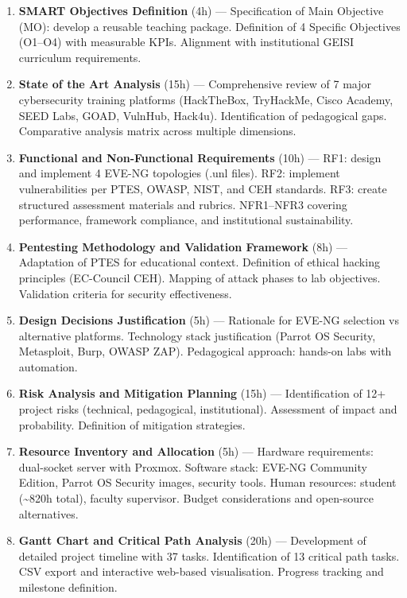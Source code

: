 \begin{enumerate}

\item \textbf{SMART Objectives Definition} (4h) --- Specification of Main Objective (MO):
develop a reusable teaching package. Definition of 4 Specific Objectives (O1--O4) with
measurable KPIs. Alignment with institutional GEISI curriculum requirements.

\item \textbf{State of the Art Analysis} (15h) --- Comprehensive review of 7 major
cybersecurity training platforms (HackTheBox, TryHackMe, Cisco Academy, SEED Labs, GOAD,
VulnHub, Hack4u). Identification of pedagogical gaps. Comparative analysis matrix across
multiple dimensions.

\item \textbf{Functional and Non-Functional Requirements} (10h) --- RF1: design and
implement 4 EVE-NG topologies (.unl files). RF2: implement vulnerabilities per
PTES\cite{ptes}, OWASP\cite{owasp_testing_guide}, NIST\cite{nist_framework}, and
CEH\cite{ceh_framework} standards. RF3: create structured assessment materials and rubrics.
NFR1--NFR3 covering performance, framework compliance, and institutional sustainability.

\item \textbf{Pentesting Methodology and Validation Framework} (8h) --- Adaptation of PTES
for educational context. Definition of ethical hacking principles (EC-Council CEH).
Mapping of attack phases to lab objectives. Validation criteria for security effectiveness.

\item \textbf{Design Decisions Justification} (5h) --- Rationale for EVE-NG selection vs
alternative platforms. Technology stack justification (Parrot OS Security, Metasploit, Burp,
OWASP ZAP). Pedagogical approach: hands-on labs with automation.

\item \textbf{Risk Analysis and Mitigation Planning} (15h) --- Identification of 12+ project
risks (technical, pedagogical, institutional). Assessment of impact and probability.
Definition of mitigation strategies.

\item \textbf{Resource Inventory and Allocation} (5h) --- Hardware requirements: dual-socket
server with Proxmox. Software stack: EVE-NG Community Edition, Parrot OS Security images,
security tools. Human resources: student (\textasciitilde{}820h total), faculty supervisor.
Budget considerations and open-source alternatives.

\item \textbf{Gantt Chart and Critical Path Analysis} (20h) --- Development of detailed
project timeline with 37 tasks. Identification of 13 critical path tasks. CSV export and
interactive web-based visualisation. Progress tracking and milestone definition.

\end{enumerate}


